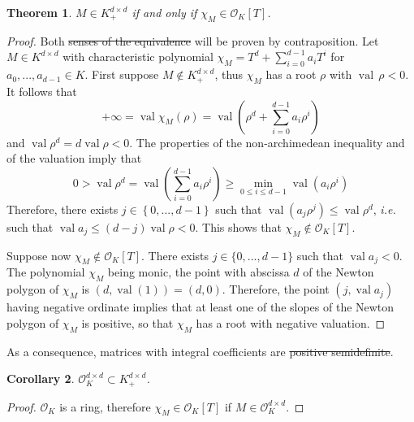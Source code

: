 \documentclass[sigconf]{acmart}
\newtheorem{theorem}{Theorem}[section]
\newtheorem{corollary}[theorem]{Corollary}
\DeclareMathOperator{\val}{val}
\newcommand{\OK}{\mathcal{O}_K}
\providecommand{\DIFaddtex}[1]{{\protect\color{blue}\uwave{#1}}} %
\providecommand{\DIFdeltex}[1]{{\protect\color{red}\sout{#1}}}                      %
\providecommand{\DIFaddbegin}{} %
\providecommand{\DIFaddend}{} %
\providecommand{\DIFdelbegin}{} %
\providecommand{\DIFdelend}{} %
\providecommand{\DIFadd}[1]{\texorpdfstring{\DIFaddtex{#1}}{#1}} %
\providecommand{\DIFdel}[1]{\texorpdfstring{\DIFdeltex{#1}}{}} %
\newcommand{\DIFscaledelfig}{0.5}
\newlength{\DIFdelgraphicswidth} %
\newlength{\DIFdelgraphicsheight} %
\newcommand{\DIFaddincludegraphics}[2][]{{\color{blue}\fbox{\DIFOincludegraphics[#1]{#2}}}} %
\newcommand{\DIFdelincludegraphics}[2][]{%
\sbox{\DIFdelgraphicsbox}{\DIFOincludegraphics[#1]{#2}}%
\settoboxwidth{\DIFdelgraphicswidth}{\DIFdelgraphicsbox} %
\settoboxtotalheight{\DIFdelgraphicsheight}{\DIFdelgraphicsbox} %
\scalebox{\DIFscaledelfig}{%
\parbox[b]{\DIFdelgraphicswidth}{\usebox{\DIFdelgraphicsbox}\\[-\baselineskip] \rule{\DIFdelgraphicswidth}{0em}}\llap{\resizebox{\DIFdelgraphicswidth}{\DIFdelgraphicsheight}{%
\setlength{\unitlength}{\DIFdelgraphicswidth}%
\begin{picture}(1,1)%
\thicklines\linethickness{2pt} %
{\color[rgb]{1,0,0}\put(0,0){\framebox(1,1){}}}%
{\color[rgb]{1,0,0}\put(0,0){\line( 1,1){1}}}%
{\color[rgb]{1,0,0}\put(0,1){\line(1,-1){1}}}%
\end{picture}%
}\hspace*{3pt}}} %
} %
\DeclareRobustCommand{\DIFaddbegin}{\DIFOaddbegin \let\includegraphics\DIFaddincludegraphics} %
\DeclareRobustCommand{\DIFaddend}{\DIFOaddend \let\includegraphics\DIFOincludegraphics} %
\DeclareRobustCommand{\DIFdelbegin}{\DIFOdelbegin \let\includegraphics\DIFdelincludegraphics} %
\DeclareRobustCommand{\DIFdelend}{\DIFOaddend \let\includegraphics\DIFOincludegraphics} %
\begin{document}
\begin{theorem}
  \label{caracsdp}
  $M \in K^{d\times d}_+$ if and only if $\chi_M \in \OK[T]$.
\end{theorem}
\begin{proof}
  Both \DIFdelbegin \DIFdel{senses of the equivalence }\DIFdelend \DIFaddbegin \DIFadd{implications }\DIFaddend will be proven by contraposition.
  Let $M \in K^{d\times d}$ with characteristic polynomial $\chi_M = T^d + \sum_{i=0}^{d-1} a_i T^i$ for $a_0,...,a_{d-1} \in K$.
  First suppose $M \not \in K^{d\times d}_+$, thus $\chi_M$ has a root $\rho$ with $\val\,\rho<0$.
  It follows that
  $$
  + \infty = \val \chi_M (\rho) = \val \left(\rho^d+ \sum_{i=0}^{d-1} a_i \rho^i\right)
  $$ and $\val \rho^d = d \val \rho <0$.
  The properties of the non-archimedean inequality and of the valuation imply that
  $$
  0> \val \rho^d = \val\left(\sum_{i=0}^{d-1} a_i \rho^i\right) \geq
  \min_{0 \leq i \leq d-1} \val \left(a_i \rho^i\right)
  $$
  Therefore, there exists $j \in \left\{0,...,d-1\right\}$ such that $\val(a_j \rho^j) \le \val\rho^d$,
  {\it i.e.} such that $\val a_j \le (d-j) \val \rho <0$. This shows that $\chi_M \not\in \OK[T]$.


  Suppose now $\chi_M \not\in \OK[T]$. There exists $j \in \{0,...,d-1\}$ such that $\val a_j <0$.
  The polynomial $\chi_M$ being monic, the point with abscissa $d$ of the Newton polygon of $\chi_M$ is
  $(d,\val(1)) = (d,0)$. 
  Therefore, the point $(j, \val a_j)$ having negative ordinate implies that at least one of the slopes of
  the Newton polygon of $\chi_M$ is positive, so that $\chi_M$ has a root with negative valuation.
\end{proof}

As a consequence, matrices with integral coefficients are \DIFdelbegin \DIFdel{positive semidefinite}\DIFdelend \DIFaddbegin \DIFadd{psd}\DIFaddend .

\begin{corollary}\label{cor_caracsdp}
  $\OK^{d\times d} \subset K^{d\times d}_+$.
\end{corollary}
\begin{proof}
  $\OK$ is a ring, therefore $\chi_M \in \OK[T]$ if $M \in \OK^{d \times d}$.
\end{proof}
\DIFdelbegin %
\end{document}
